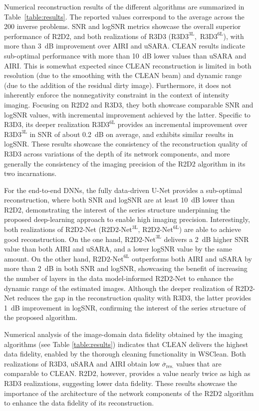 \documentclass[preprint2,twocolumn]{aastex631}
\begin{document}
Numerical reconstruction results of the different algorithms are summarized in Table~\ref{table:results}. The reported values correspond to the average across the 200 inverse problems. SNR and logSNR metrics showcase the overall superior performance of R2D2, and both realizations of R3D3 ($\textrm{R3D3}^{\textrm{3L}}$,~$\textrm{R3D3}^{\textrm{6L}}$), with more than 3~dB improvement over AIRI and uSARA. CLEAN results indicate sub-optimal performance with more than 10~dB lower values than uSARA and AIRI. {This is somewhat expected since CLEAN reconstruction is limited in both resolution (due to the smoothing with the CLEAN beam) and dynamic range (due to the addition of the residual dirty image). Furthermore, it does not inherently enforce the nonnegativity constraint in the context of intensity imaging.} Focusing on R2D2 and R3D3, they both showcase comparable SNR and logSNR values, with incremental improvement achieved by the latter. Specific to R3D3, its deeper realization $\textrm{R3D3}^{\textrm{6L}}$ provides {an incremental} improvement over $\textrm{R3D3}^{\textrm{3L}}$ in SNR {of about 0.2~dB on average}, and exhibits similar results in logSNR. {These results showcase the consistency of the reconstruction quality of R3D3 across variations of the depth of its network components, and more generally the consistency of the imaging precision of the R2D2 algorithm in its two incarnations.}  

For the end-to-end DNNs, the fully data-driven U-Net provides a sub-optimal reconstruction, where both SNR and logSNR are at least 10~dB lower than R2D2, demonstrating the interest of the series structure underpinning the proposed deep-learning approach to enable high imaging precision. Interestingly, both realizations of R2D2-Net ($\textrm{R2D2-Net}^{\textrm{3L}}$, $\textrm{R2D2-Net}^{\textrm{6L}}$) are able to achieve good reconstruction. On the one hand, $\textrm{R2D2-Net}^{\textrm{3L}}$ delivers a 2~dB higher SNR value than both AIRI and uSARA, and a lower logSNR value by the same amount. On the other hand, $\textrm{R2D2-Net}^{\textrm{6L}}$ outperforms both AIRI and uSARA by more than 2~dB in both SNR and logSNR, showcasing the benefit of increasing the number of layers in the data model-informed R2D2-Net to enhance the dynamic range of the estimated images. Although the deeper realization of R2D2-Net reduces the gap in the reconstruction quality with R3D3, the latter provides 1~dB improvement in logSNR, confirming the interest of the series structure of the proposed algorithm. 

Numerical analysis of the image-domain data fidelity obtained by the imaging algorithms (see Table \ref{table:results}) indicates that CLEAN delivers the highest data fidelity, enabled by the thorough cleaning functionality in WSClean. Both realizations of R3D3, uSARA and AIRI obtain low $\overline{\sigma}_{\textrm{res.}}$ values that are comparable to CLEAN. R2D2, however, provides a value nearly twice as high as R3D3 realizations, suggesting lower data fidelity. These results showcase the importance of the architecture of the network components of the R2D2 algorithm to enhance the data fidelity of its reconstruction. 
\end{document}
